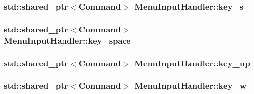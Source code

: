 \subsubsection[{key\+\_\+s}]{\setlength{\rightskip}{0pt plus 5cm}std\+::shared\+\_\+ptr$<${\bf Command}$>$ Menu\+Input\+Handler\+::key\+\_\+s\hspace{0.3cm}{\ttfamily [private]}}\label{class_menu_input_handler_aa16ab7856da1bc4c6dea371e244939fb}
\hypertarget{class_menu_input_handler_a8f596f6b958c7007a3ccc44ac3d8666e}{}
\subsubsection[{key\+\_\+space}]{\setlength{\rightskip}{0pt plus 5cm}std\+::shared\+\_\+ptr$<${\bf Command}$>$ Menu\+Input\+Handler\+::key\+\_\+space\hspace{0.3cm}{\ttfamily [private]}}\label{class_menu_input_handler_a8f596f6b958c7007a3ccc44ac3d8666e}
\hypertarget{class_menu_input_handler_ae1b3b9df835e3182dba3bbf1fd8b98aa}{}
\subsubsection[{key\+\_\+up}]{\setlength{\rightskip}{0pt plus 5cm}std\+::shared\+\_\+ptr$<${\bf Command}$>$ Menu\+Input\+Handler\+::key\+\_\+up\hspace{0.3cm}{\ttfamily [private]}}\label{class_menu_input_handler_ae1b3b9df835e3182dba3bbf1fd8b98aa}
\hypertarget{class_menu_input_handler_a052c981814cc918c88d17d7b4f0deb0e}{}
\subsubsection[{key\+\_\+w}]{\setlength{\rightskip}{0pt plus 5cm}std\+::shared\+\_\+ptr$<${\bf Command}$>$ Menu\+Input\+Handler\+::key\+\_\+w\hspace{0.3cm}{\ttfamily [private]}}\label{class_menu_input_handler_a052c981814cc918c88d17d7b4f0deb0e}
\hypertarget{class_menu_input_handler_adda8b05fe971a0ed749bb0037d3ba4bd}{}
